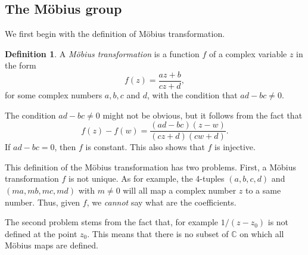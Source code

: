 \documentclass[12pt]{book}
\newcommand{\CC}{\mathbb C}
\theoremstyle{definition}
\newtheorem{definition}{Definition}[section]
\theoremstyle{remark}
\begin{document}
	\subsection{The M\"obius group}
		We first begin with the definition of M\"obius transformation.
		\begin{definition}
			A \textit{M\"obius transformation} is a function $f$ of a complex variable $z$ in the form
			\begin{equation*}
				f(z) = \frac{az + b}{cz + d},
			\end{equation*}
			for some complex numbers $a, b, c$ and $d$, with the condition that $ad - bc \neq 0$.
		\end{definition}
		The condition $ad - bc \neq 0$ might not be obvious, but it follows from the fact that
		\begin{equation*}
			f(z) - f(w) = \frac{(ad - bc)(z - w)}{(cz+d)(cw + d)}.
		\end{equation*}
		If $ad - bc = 0$, then $f$ is constant. This also shows that $f$ is injective.
		
		This definition of the M\"obius transformation has two problems. First, a M\"obius transformation $f$ is not unique. As for example, the 4-tuples $(a,b,c,d)$ and $(ma, mb, mc, md)$ with $m \neq 0$ will all map a complex number $z$ to a same number. Thus, given $f$, we \textit{cannot} say what are the coefficients.
		
		The second problem stems from the fact that, for example $1/(z - z_0)$ is not defined at the point $z_0$. This means that there is no subset of $\CC$ on which all M\"obius maps are defined.
		
\end{document}
